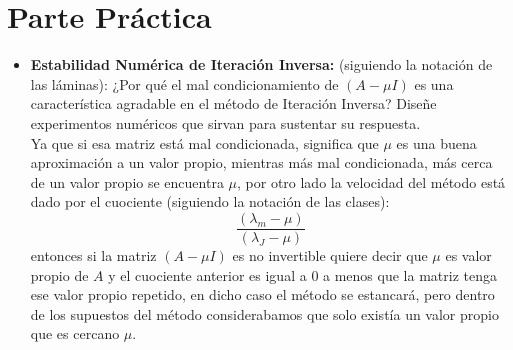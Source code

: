 \documentclass{article}
\begin{document}
\section*{Parte Práctica}
\begin{itemize}
\item {\bf Estabilidad Numérica de Iteración Inversa: }(siguiendo la notación de las láminas): ¿Por qué el mal condicionamiento de $(A-\mu I)$ es una característica agradable en el método de Iteración Inversa? Diseñe experimentos numéricos que sirvan para sustentar su respuesta.\\

Ya que si esa matriz está mal condicionada, significa que $\mu$ es una buena aproximación a un valor propio, mientras más mal condicionada, más cerca de un valor propio se encuentra $\mu$, por otro lado la velocidad del método está dado por el cuociente (siguiendo la notación de las clases):
\[\frac{(\lambda_{m}-\mu)}{(\lambda_{J}-\mu)}\]
entonces si la matriz $(A-\mu I)$ es no invertible quiere decir que $\mu$ es valor propio de $A$ y el cuociente anterior es igual a $0$ a menos que la matriz tenga ese valor propio repetido, en dicho caso el método se estancará, pero dentro de los supuestos del método considerabamos que solo existía un valor propio que es cercano $\mu$.\\


\end{itemize}
\end{document}

